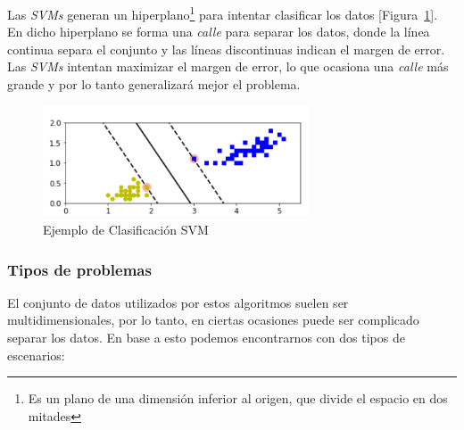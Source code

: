 Las \textit{SVMs} generan un hiperplano\footnote{Es un plano de una dimensión inferior al origen, que divide el espacio en dos mitades} para intentar clasificar los datos [Figura~\ref{fig:svm_example}]. En dicho hiperplano se forma una \textit{calle} para separar los datos, donde la línea continua separa el conjunto y las líneas discontinuas indican el margen de error. Las \textit{SVMs} intentan maximizar el margen de error, lo que ocasiona una \textit{calle} más grande y por lo tanto generalizará mejor el problema.

\begin{figure}[h]
    \centering
    \includegraphics[width=0.7\textwidth, keepaspectratio]{imaxes/svm_exmaple.png}
    \caption{Ejemplo de Clasificación SVM}
     \label{fig:svm_example}
\end{figure}


\subsubsection{Tipos de problemas}

El conjunto de datos utilizados por estos algoritmos suelen ser multidimensionales, por lo tanto, en ciertas ocasiones puede ser complicado separar los datos. En base a esto podemos encontrarnos con dos tipos de escenarios:


